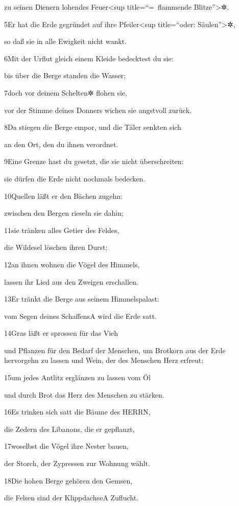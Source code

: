 zu seinen Dienern lohendes Feuer\textless sup title=``=~flammende
Blitze''\textgreater✲.

5Er hat die Erde gegründet auf ihre Pfeiler\textless sup title=``oder:
Säulen''\textgreater✲,

so daß sie in alle Ewigkeit nicht wankt.

6Mit der Urflut gleich einem Kleide bedecktest du sie:

bis über die Berge standen die Wasser;

7doch vor deinem Schelten✲ flohen sie,

vor der Stimme deines Donners wichen sie angstvoll zurück.

8Da stiegen die Berge empor, und die Täler senkten sich

an den Ort, den du ihnen verordnet.

9Eine Grenze hast du gesetzt, die sie nicht überschreiten:

sie dürfen die Erde nicht nochmals bedecken.

10Quellen läßt er den Bächen zugehn:

zwischen den Bergen rieseln sie dahin;

11sie tränken alles Getier des Feldes,

die Wildesel löschen ihren Durst;

12an ihnen wohnen die Vögel des Himmels,

lassen ihr Lied aus den Zweigen erschallen.

13Er tränkt die Berge aus seinem Himmelspalast:

vom Segen deines Schaffens{A} wird die Erde satt.

14Gras läßt er sprossen für das Vieh

und Pflanzen für den Bedarf der Menschen, um Brotkorn aus der Erde
hervorgehn zu lassen und Wein, der des Menschen Herz erfreut;

15um jedes Antlitz erglänzen zu lassen vom Öl

und durch Brot das Herz des Menschen zu stärken.

16Es trinken sich satt die Bäume des HERRN,

die Zedern des Libanons, die er gepflanzt,

17woselbst die Vögel ihre Nester bauen,

der Storch, der Zypressen zur Wohnung wählt.

18Die hohen Berge gehören den Gemsen,

die Felsen sind der Klippdachse{A} Zuflucht.

